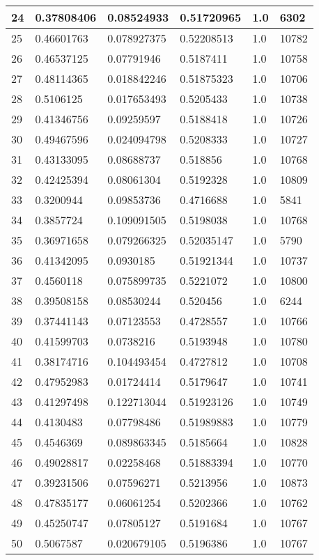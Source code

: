 \begin{longtable}{|l|l|l|l|l|l|}
24 & 0.37808406 & 0.08524933 & 0.51720965 & 1.0 & 6302 \\ \hline 
25 & 0.46601763 & 0.078927375 & 0.52208513 & 1.0 & 10782 \\ \hline 
26 & 0.46537125 & 0.07791946 & 0.5187411 & 1.0 & 10758 \\ \hline 
27 & 0.48114365 & 0.018842246 & 0.51875323 & 1.0 & 10706 \\ \hline 
28 & 0.5106125 & 0.017653493 & 0.5205433 & 1.0 & 10738 \\ \hline 
29 & 0.41346756 & 0.09259597 & 0.5188418 & 1.0 & 10726 \\ \hline 
30 & 0.49467596 & 0.024094798 & 0.5208333 & 1.0 & 10727 \\ \hline 
31 & 0.43133095 & 0.08688737 & 0.518856 & 1.0 & 10768 \\ \hline 
32 & 0.42425394 & 0.08061304 & 0.5192328 & 1.0 & 10809 \\ \hline 
33 & 0.3200944 & 0.09853736 & 0.4716688 & 1.0 & 5841 \\ \hline 
34 & 0.3857724 & 0.109091505 & 0.5198038 & 1.0 & 10768 \\ \hline 
35 & 0.36971658 & 0.079266325 & 0.52035147 & 1.0 & 5790 \\ \hline 
36 & 0.41342095 & 0.0930185 & 0.51921344 & 1.0 & 10737 \\ \hline 
37 & 0.4560118 & 0.075899735 & 0.5221072 & 1.0 & 10800 \\ \hline 
38 & 0.39508158 & 0.08530244 & 0.520456 & 1.0 & 6244 \\ \hline 
39 & 0.37441143 & 0.07123553 & 0.4728557 & 1.0 & 10766 \\ \hline 
40 & 0.41599703 & 0.0738216 & 0.5193948 & 1.0 & 10780 \\ \hline 
41 & 0.38174716 & 0.104493454 & 0.4727812 & 1.0 & 10708 \\ \hline 
42 & 0.47952983 & 0.01724414 & 0.5179647 & 1.0 & 10741 \\ \hline 
43 & 0.41297498 & 0.122713044 & 0.51923126 & 1.0 & 10749 \\ \hline 
44 & 0.4130483 & 0.07798486 & 0.51989883 & 1.0 & 10779 \\ \hline 
45 & 0.4546369 & 0.089863345 & 0.5185664 & 1.0 & 10828 \\ \hline 
46 & 0.49028817 & 0.02258468 & 0.51883394 & 1.0 & 10770 \\ \hline 
47 & 0.39231506 & 0.07596271 & 0.5213956 & 1.0 & 10873 \\ \hline 
48 & 0.47835177 & 0.06061254 & 0.5202366 & 1.0 & 10762 \\ \hline 
49 & 0.45250747 & 0.07805127 & 0.5191684 & 1.0 & 10767 \\ \hline 
50 & 0.5067587 & 0.020679105 & 0.5196386 & 1.0 & 10767 \\ \hline 
\end{longtable}